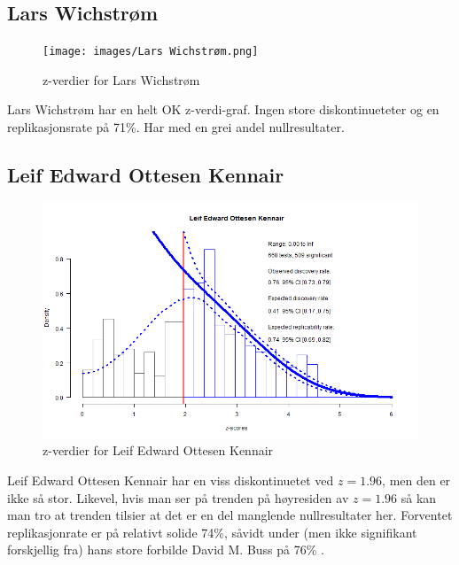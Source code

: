 \documentclass[doc,norsk]{apa7}
\begin{document}
\subsection{Lars Wichstrøm}
\begin{figure}[h!]
    \centering
    \texttt{[image: images/Lars Wichstrøm.png]}
    \caption{z-verdier for Lars Wichstrøm}
\end{figure}
Lars Wichstrøm har en helt OK z-verdi-graf. Ingen store diskontinueteter og en replikasjonsrate på 71\%. Har med en grei andel nullresultater.

\subsection{Leif Edward Ottesen Kennair}
\begin{figure}[h!]
    \centering
    \includegraphics[width=\textwidth]{images/Leif Edward Ottesen Kennair.png}
    \caption{z-verdier for Leif Edward Ottesen Kennair}
\end{figure}
Leif Edward Ottesen Kennair har en viss diskontinuetet ved $z=1.96$, men den er ikke så stor. Likevel, hvis man ser på trenden på høyresiden av $z=1.96$ så kan man tro at trenden tilsier at det er en del manglende nullresultater her. Forventet replikasjonrate er på relativt solide 74\%, såvidt under (men ikke signifikant forskjellig fra) hans store forbilde David M. Buss på 76\% \parencite{z-curve-david-buss}.
\end{document}
